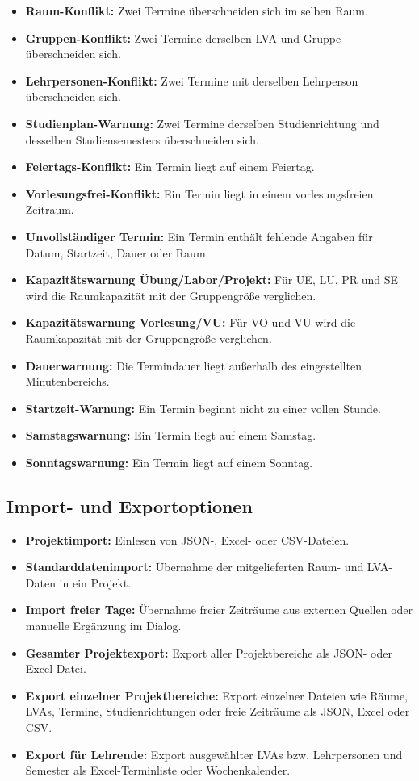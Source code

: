 \documentclass[12pt,a4paper]{article}
\begin{document}
\begin{itemize}
\item \textbf{Raum-Konflikt:} Zwei Termine überschneiden sich im selben Raum.
\item \textbf{Gruppen-Konflikt:} Zwei Termine derselben LVA und Gruppe überschneiden sich.
\item \textbf{Lehrpersonen-Konflikt:} Zwei Termine mit derselben Lehrperson überschneiden sich.
\item \textbf{Studienplan-Warnung:} Zwei Termine derselben Studienrichtung und desselben Studiensemesters überschneiden sich.
\item \textbf{Feiertags-Konflikt:} Ein Termin liegt auf einem Feiertag.
\item \textbf{Vorlesungsfrei-Konflikt:} Ein Termin liegt in einem vorlesungsfreien Zeitraum.
\item \textbf{Unvollständiger Termin:} Ein Termin enthält fehlende Angaben für Datum, Startzeit, Dauer oder Raum.
\item \textbf{Kapazitätswarnung Übung/Labor/Projekt:} Für UE, LU, PR und SE wird die Raumkapazität mit der Gruppengröße verglichen.
\item \textbf{Kapazitätswarnung Vorlesung/VU:} Für VO und VU wird die Raumkapazität mit der Gruppengröße verglichen.
\item \textbf{Dauerwarnung:} Die Termindauer liegt außerhalb des eingestellten Minutenbereichs.
\item \textbf{Startzeit-Warnung:} Ein Termin beginnt nicht zu einer vollen Stunde.
\item \textbf{Samstagswarnung:} Ein Termin liegt auf einem Samstag.
\item \textbf{Sonntagswarnung:} Ein Termin liegt auf einem Sonntag.
\end{itemize}

\subsection{Import- und Exportoptionen}

\begin{itemize}
\item \textbf{Projektimport:} Einlesen von JSON-, Excel- oder CSV-Dateien.
\item \textbf{Standarddatenimport:} Übernahme der mitgelieferten Raum- und LVA-Daten in ein Projekt.
\item \textbf{Import freier Tage:} Übernahme freier Zeiträume aus externen Quellen oder manuelle Ergänzung im Dialog.
\item \textbf{Gesamter Projektexport:} Export aller Projektbereiche als JSON- oder Excel-Datei.
\item \textbf{Export einzelner Projektbereiche:} Export einzelner Dateien wie Räume, LVAs, Termine, Studienrichtungen oder freie Zeiträume als JSON, Excel oder CSV.
\item \textbf{Export für Lehrende:} Export ausgewählter LVAs bzw. Lehrpersonen und Semester als Excel-Terminliste oder Wochenkalender.
\end{itemize}
\end{document}
